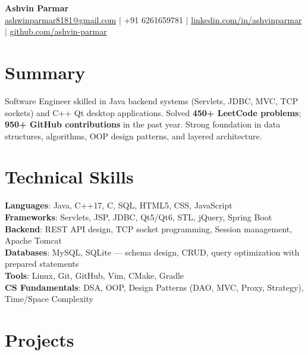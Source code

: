 \documentclass[a4paper,10pt]{article}
\begin{document}
\begin{center}
    {\LARGE \textbf{Ashvin Parmar}}\\
    \vspace{1mm}
    \href{mailto:ashwinparmar8181@gmail.com}{ashwinparmar8181@gmail.com} $|$
    +91 6261659781 $|$
    \href{https://www.linkedin.com/in/ashvinparmar/}{linkedin.com/in/ashvinparmar} $|$
    \href{https://github.com/ashvin-parmar}{github.com/ashvin-parmar}
\end{center}

\section*{Summary}
Software Engineer skilled in Java backend systems (Servlets, JDBC, MVC, TCP sockets) and C++ Qt desktop applications. Solved \textbf{450+ LeetCode problems}; \textbf{950+ GitHub contributions} in the past year. Strong foundation in data structures, algorithms, OOP design patterns, and layered architecture.

\section*{Technical Skills}
\textbf{Languages}: Java, C++17, C, SQL, HTML5, CSS, JavaScript \\
\textbf{Frameworks}: Servlets, JSP, JDBC, Qt5/Qt6, STL, jQuery, Spring Boot \\
\textbf{Backend}: REST API design, TCP socket programming, Session management, Apache Tomcat \\
\textbf{Databases}: MySQL, SQLite --- schema design, CRUD, query optimization with prepared statements \\
\textbf{Tools}: Linux, Git, GitHub, Vim, CMake, Gradle \\
\textbf{CS Fundamentals}: DSA, OOP, Design Patterns (DAO, MVC, Proxy, Strategy), Time/Space Complexity

\section*{Projects}
\end{document}
